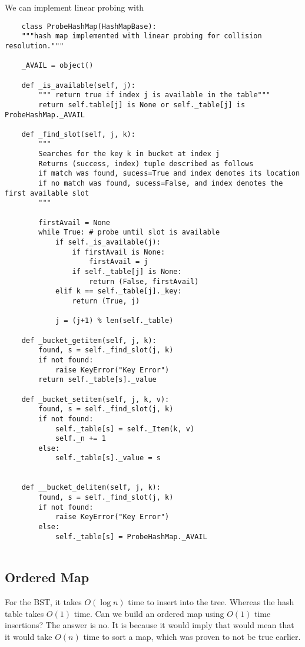 \documentclass[]{article}
\begin{document}
We can implement linear probing with

\begin{lstlisting}
	class ProbeHashMap(HashMapBase):
	"""hash map implemented with linear probing for collision resolution."""
	
	_AVAIL = object()
	
	def _is_available(self, j):
		""" return true if index j is available in the table"""
		return self.table[j] is None or self._table[j] is ProbeHashMap._AVAIL
	
	def _find_slot(self, j, k):
		""" 
		Searches for the key k in bucket at index j 
		Returns (success, index) tuple described as follows
		if match was found, sucess=True and index denotes its location
		if no match was found, sucess=False, and index denotes the first available slot
		"""
		
		firstAvail = None
		while True: # probe until slot is available
			if self._is_available(j):
				if firstAvail is None:
					firstAvail = j
				if self._table[j] is None:
					return (False, firstAvail)
			elif k == self._table[j]._key:
				return (True, j)
			
			j = (j+1) % len(self._table)
	
	def _bucket_getitem(self, j, k):
		found, s = self._find_slot(j, k)
		if not found:
			raise KeyError("Key Error")
		return self._table[s]._value
	
	def _bucket_setitem(self, j, k, v):
		found, s = self._find_slot(j, k)
		if not found:
			self._table[s] = self._Item(k, v)
			self._n += 1
		else:
			self._table[s]._value = s
		
	
	def __bucket_delitem(self, j, k):
		found, s = self._find_slot(j, k)
		if not found:
			raise KeyError("Key Error")
		else:
			self._table[s] = ProbeHashMap._AVAIL
	
\end{lstlisting}\bigbreak


\subsection{Ordered Map}\bigbreak

For the BST, it takes $O(\log n)$ time to insert into the tree. Whereas the hash table takes $O(1)$ time. Can we build an ordered map using $O(1)$ time insertions? The answer is no. It is because it would imply that would mean that it would take $O(n)$ time to sort a map, which was proven to not be true earlier. \\
\end{document}
